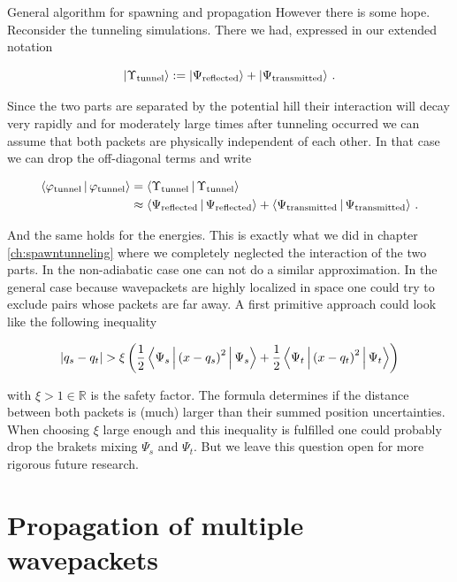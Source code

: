 \begin{chapter}{General algorithm for spawning and propagation}
However there is some hope. Reconsider the tunneling simulations. There we had,
expressed in our extended notation

\begin{equation}
  \Ket{\Upsilon_\text{tunnel}} := \Ket{\Psi_\text{reflected}} + \Ket{\Psi_\text{transmitted}} \,.
\end{equation}

Since the two parts are separated by the potential hill their interaction will
decay very rapidly and for moderately large times after tunneling occurred we can
assume that both packets are physically independent of each other. In that case
we can drop the off-diagonal terms and write

\begin{equation}
\begin{split}
  \Braket{\varphi_\text{tunnel}|\varphi_\text{tunnel}} & = 
  \Braket{\Upsilon_\text{tunnel}|\Upsilon_\text{tunnel}} \\
  & \approx \Braket{\Psi_\text{reflected}|\Psi_\text{reflected}} + \Braket{\Psi_\text{transmitted}|\Psi_\text{transmitted}} \,.
\end{split}
\end{equation}

And the same holds for the energies. This is exactly what we did in chapter \ref{ch:spawntunneling}
where we completely neglected the interaction of the two parts. In the non-adiabatic
case one can not do a similar approximation. In the general case because wavepackets
are highly localized in space one could try to exclude pairs whose packets are far
away. A first primitive approach could look like the following inequality

\begin{equation}
  |q_s - q_t| > \xi \left(\frac{1}{2}\Braket{\Psi_s|\left(x-q_s\right)^2|\Psi_s} + \frac{1}{2}\Braket{\Psi_t|\left(x-q_t\right)^2|\Psi_t}\right)
\end{equation}

with $\xi > 1 \in \mathbb{R}$ is the safety factor. The formula determines if the
distance between both packets is (much) larger than their summed position uncertainties.
When choosing $\xi$ large enough and this inequality is fulfilled one could probably
drop the brakets mixing $\Psi_s$ and $\Psi_t$. But we leave this question open
for more rigorous future research.


\section{Propagation of multiple wavepackets}
\label{sec:multi_propagation}


\end{chapter}
